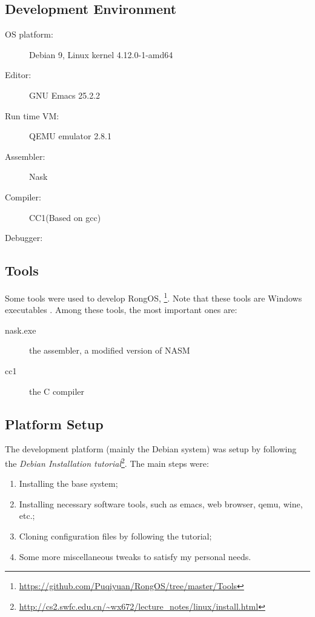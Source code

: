 \documentclass{swfcthesis}
\begin{document}
\subsection{Development Environment}
\label{sec:devel-envir}

\begin{description}
\item[OS platform:] Debian 9, Linux kernel 4.12.0-1-amd64
\item[Editor:] GNU Emacs 25.2.2
\item[Run time VM:] QEMU emulator 2.8.1
\item[Assembler:] Nask
\item[Compiler:] CC1(Based on gcc)
\item[Debugger:] 
\end{description}

\subsection{Tools}
\label{sec:tools}

Some tools were used to develop RongOS, \footnote{\url{https://github.com/Puqiyuan/RongOS/tree/master/Tools}}. Note
that these tools are Windows executables . Among these tools, the most important ones are:

\begin{description}
\item[nask.exe] the assembler, a modified version of NASM
\item[cc1] the C compiler
\end{description}

\subsection{Platform Setup}
\label{sec:install}

The development platform (mainly the Debian system) was setup by following the
\emph{Debian Installation
  tutorial}\footnote{\url{http://cs2.swfc.edu.cn/~wx672/lecture_notes/linux/install.html}}. The
main steps were:
\begin{enumerate}
\item Installing the base system;
\item Installing necessary software tools, such as emacs, web browser, qemu, wine, etc.;
\item Cloning configuration files by following the tutorial;
\item Some more miscellaneous tweaks to satisfy my personal needs.
\end{enumerate}
\end{document}
